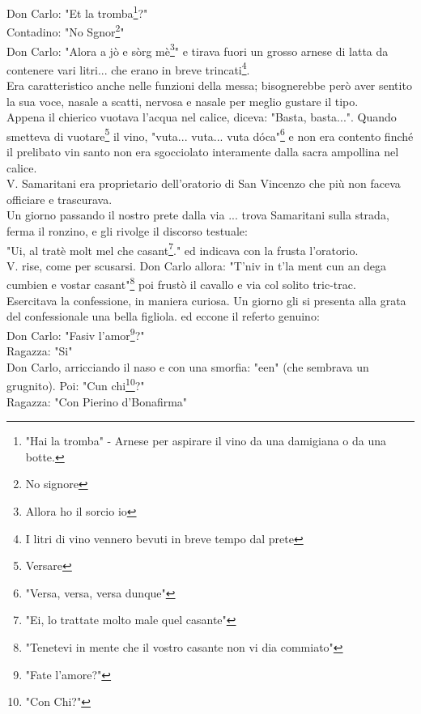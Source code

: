 \documentclass[10pt]{memoir} %
\begin{document}
Don Carlo: "Et la tromba\footnote{"Hai la tromba" - Arnese per aspirare il vino da una damigiana o da una botte.}?"\\
Contadino: "No Sgnor\footnote{No signore}"\\
Don Carlo: "Alora a jò e sòrg mè\footnote{Allora ho il sorcio io}" e tirava fuori un grosso arnese di latta da contenere vari litri... che erano in breve trincati\footnote{I litri di vino vennero bevuti in breve tempo dal prete}.\\
Era caratteristico anche nelle funzioni della messa; bisognerebbe però aver sentito la sua voce, nasale a scatti, nervosa e nasale per meglio gustare il tipo.\\
Appena il chierico vuotava l'acqua nel calice, diceva: "Basta, basta...". Quando smetteva di vuotare\footnote{Versare} il vino, "vuta... vuta... vuta dóca"\footnote{"Versa, versa, versa dunque"} e non era contento finché il prelibato vin santo non era sgocciolato interamente dalla sacra ampollina nel calice.\\
V. Samaritani era proprietario dell'oratorio di San Vincenzo che più non faceva officiare e trascurava.\\
Un giorno passando il nostro prete dalla via ... trova Samaritani sulla strada, ferma il ronzino, e gli rivolge il discorso testuale:\\
"Ui, al tratè molt mel che casant\footnote{"Ei, lo trattate molto male quel casante"}." ed indicava con la frusta l'oratorio.\\
V. rise, come per scusarsi. Don Carlo allora: "T'niv in t'la ment cun an dega cumbien e vostar casant"\footnote{"Tenetevi in mente che il vostro casante non vi dia commiato"} poi frustò il cavallo e via col solito tric-trac.\\
Esercitava la confessione, in maniera curiosa. Un giorno gli si presenta alla grata del confessionale una bella figliola. ed eccone il referto genuino:\\
Don Carlo: "Fasiv l'amor\footnote{"Fate l'amore?"}?"\\
Ragazza: "Si"\\
Don Carlo, arricciando il naso e con una smorfia: "een" (che sembrava un grugnito). Poi: "Cun chi\footnote{"Con Chi?"}?"\\
Ragazza: "Con Pierino d'Bonafirma"\\
\end{document}
